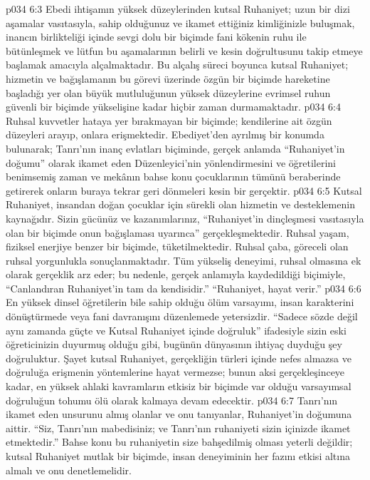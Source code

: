 \vs p034 6:3 Ebedi ihtişamın yüksek düzeylerinden kutsal Ruhaniyet; uzun bir dizi aşamalar vasıtasıyla, sahip olduğunuz ve ikamet ettiğiniz kimliğinizle buluşmak, inancın birlikteliği içinde sevgi dolu bir biçimde fani kökenin ruhu ile bütünleşmek ve lütfun bu aşamalarının belirli ve kesin doğrultusunu takip etmeye başlamak amacıyla alçalmaktadır. Bu alçalış süreci boyunca kutsal Ruhaniyet; hizmetin ve bağışlamanın bu görevi üzerinde özgün bir biçimde hareketine başladığı yer olan büyük mutluluğunun yüksek düzeylerine evrimsel ruhun güvenli bir biçimde yükselişine kadar hiçbir zaman durmamaktadır.
\vs p034 6:4 Ruhsal kuvvetler hataya yer bırakmayan bir biçimde; kendilerine ait özgün düzeyleri arayıp, onlara erişmektedir. Ebediyet’den ayrılmış bir konumda bulunarak; Tanrı’nın inanç evlatları biçiminde, gerçek anlamda “Ruhaniyet’in doğumu” olarak ikamet eden Düzenleyici’nin yönlendirmesini ve öğretilerini benimsemiş zaman ve mekânın bahse konu çocuklarının tümünü beraberinde getirerek onların buraya tekrar geri dönmeleri kesin bir gerçektir.
\vs p034 6:5 Kutsal Ruhaniyet, insandan doğan çocuklar için sürekli olan hizmetin ve desteklemenin kaynağıdır. Sizin gücünüz ve kazanımlarınız, “Ruhaniyet’in dinçleşmesi vasıtasıyla olan bir biçimde onun bağışlaması uyarınca” gerçekleşmektedir. Ruhsal yaşam, fiziksel enerjiye benzer bir biçimde, tüketilmektedir. Ruhsal çaba, göreceli olan ruhsal yorgunlukla sonuçlanmaktadır. Tüm yükseliş deneyimi, ruhsal olmasına ek olarak gerçeklik arz eder; bu nedenle, gerçek anlamıyla kaydedildiği biçimiyle, “Canlandıran Ruhaniyet’in tam da kendisidir.” “Ruhaniyet, hayat verir.”
\vs p034 6:6 En yüksek dinsel öğretilerin bile sahip olduğu ölüm varsayımı, insan karakterini dönüştürmede veya fani davranışını düzenlemede yetersizdir. “Sadece sözde değil aynı zamanda güçte ve Kutsal Ruhaniyet içinde doğruluk” ifadesiyle sizin eski öğreticinizin duyurmuş olduğu gibi, bugünün dünyasının ihtiyaç duyduğu şey doğruluktur. Şayet kutsal Ruhaniyet, gerçekliğin türleri içinde nefes almazsa ve doğruluğa erişmenin yöntemlerine hayat vermezse; bunun aksi gerçekleşinceye kadar, en yüksek ahlaki kavramların etkisiz bir biçimde var olduğu varsayımsal doğruluğun tohumu ölü olarak kalmaya devam edecektir.
\vs p034 6:7 Tanrı’nın ikamet eden unsurunu almış olanlar ve onu tanıyanlar, Ruhaniyet’in doğumuna aittir. “Siz, Tanrı’nın mabedisiniz; ve Tanrı’nın ruhaniyeti sizin içinizde ikamet etmektedir.” Bahse konu bu ruhaniyetin size bahşedilmiş olması yeterli değildir; kutsal Ruhaniyet mutlak bir biçimde, insan deneyiminin her fazını etkisi altına almalı ve onu denetlemelidir.
